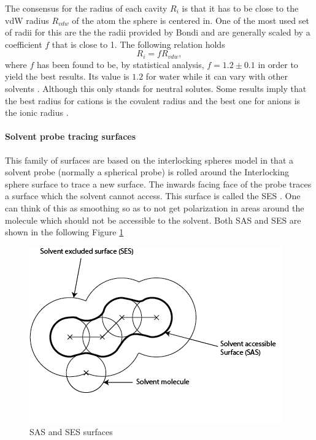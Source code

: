 \documentclass[../master_thesis.tex]{subfiles}
\begin{document}
The consensus for the radius of each cavity $R_i$ is that it has to be close to the \ac{vdW} radius
$R_{vdw}$ of the atom the sphere is centered in. One of the most used set of radii for
this are the the radii provided by Bondi \cite{doi:10.1021/j100785a001, Tomasi:2005ipa}
and are generally  scaled by a coefficient $f$ that is close to 1. The following relation holds
\cite{Tomasi:1994wt}
\begin{equation}
  R_i = fR_{vdw},
\end{equation}
where $f$ has been found to be, by statistical analysis, $f = 1.2 \pm 0.1$ in order to
yield the best results. Its value is $1.2$ for water while it can vary with
other solvents \cite{Tomasi:1994wt}. Although this only stands for neutral
solutes. Some results imply that the best radius for cations is the covalent
radius and the best one for anions is the ionic radius \cite{Tomasi:1994wt}.
\paragraph{Solvent probe tracing surfaces}\label{Spts}
This family of surfaces are based on the interlocking spheres model in that a
solvent probe (normally a spherical probe) is rolled around the Interlocking
sphere surface to trace a new surface. The inwards facing face of the probe traces a surface
which the solvent cannot access. This surface is called the \ac{SES}
\cite{Tomasi:2005ipa, Mennucci:2018}.  One can think of this as
smoothing so as to not get polarization in areas around the molecule which should
not be accessible to the solvent. Both SAS and \ac{SES} are shown in the following
Figure \ref{fig:SASSEShomemade}
\begin{figure}[ht]
  \includegraphics[width=\linewidth]{img/SASSES.png}
  \caption{SAS and SES surfaces}
  \label{fig:SASSEShomemade}
\end{figure}
\end{document}
